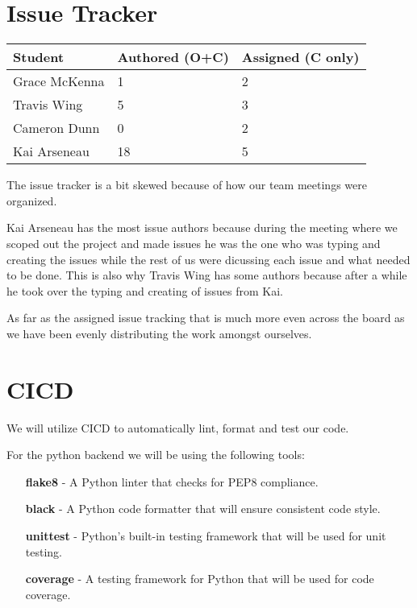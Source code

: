\documentclass{article}
\begin{document}
\section{Issue Tracker}



\begin{table}[H]
\centering
\begin{tabular}{lll}
\toprule
\textbf{Student} & \textbf{Authored (O+C)} & \textbf{Assigned (C only)}\\
\midrule
Grace McKenna & 1 & 2 \\
Travis Wing & 5 & 3 \\
Cameron Dunn & 0 & 2 \\
Kai Arseneau & 18 & 5 \\
\bottomrule
\end{tabular}
\end{table}

The issue tracker is a bit skewed because of how our team meetings were organized.

Kai Arseneau has the most issue authors because during the meeting where we scoped out the project and made issues
he was the one who was typing and creating the issues while the rest of us were dicussing each issue and what needed to be done.
This is also why Travis Wing has some authors because after a while he took over the typing and creating of issues from Kai.

As far as the assigned issue tracking that is much more even across the board as we have been evenly distributing the work amongst ourselves.


\section{CICD}

We will utilize CICD to automatically lint, format and test our code. 

For the python backend we will be using the following tools:
\begin{itemize}
  \item [\textbf{flake8}] - A Python linter that checks for PEP8 compliance.
  \item [\textbf{black}] - A Python code formatter that will ensure consistent code style.
  \item [\textbf{unittest}] - Python's built-in testing framework that will be used for unit testing.
  \item [\textbf{coverage}] - A testing framework for Python that will be used for code coverage.
\end{itemize}
\end{document}
